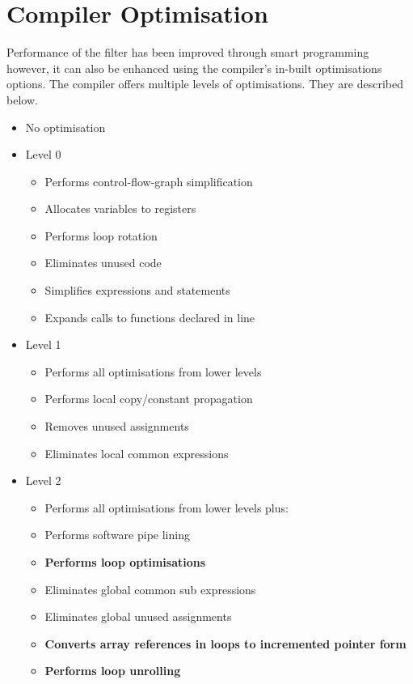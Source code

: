 \documentclass{article}
\begin{document}
\section{Compiler Optimisation}\label{sec:com_opt}
Performance of the filter has been improved through smart programming however, it can also be enhanced using the compiler's in-built optimisations options. The compiler offers multiple levels of optimisations. They are described below.\cite{ti_comp}
\begin{itemize}
    \item No optimisation
    \item Level 0
    \begin{itemize}
        \item Performs control-flow-graph simplification
        \item Allocates variables to registers
        \item Performs loop rotation
        \item Eliminates unused code
        \item Simplifies expressions and statements
        \item Expands calls to functions declared in line
    \end{itemize}
    \item Level 1
    \begin{itemize}
        \item Performs all optimisations from lower levels
        \item Performs local copy/constant propagation
        \item Removes unused assignments
        \item Eliminates local common expressions
    \end{itemize}
    \item Level 2
    \begin{itemize}
        \item Performs all optimisations from lower levels plus:
        \item Performs software pipe lining 
        \item \textbf{Performs loop optimisations}
        \item Eliminates global common sub expressions
        \item Eliminates global unused assignments
        \item \textbf{Converts array references in loops to incremented pointer form}
        \item \textbf{Performs loop unrolling}

\end{itemize}
\end{itemize}
\end{document}
